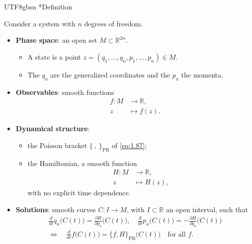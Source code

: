 \documentclass[11pt,a4paper,oneside]{report}
\makeatletter
\newcommand\topic{\@startsection{paragraph}{4}{\z@}{-1.7ex plus -.3ex}{.5ex}{\normalfont\normalsize\bfseries\itshape\boldmath}*}
\makeatother
\begin{document}
\begin{CJK*}{UTF8}{gbsn}
\topic{Definition}

Consider a system with $n$ degrees of freedom.
\begin{itemize}


\item \textbf{\boldmath Phase space}: an open set $M\subset\mathbb R^{2n}$.
\begin{itemize}


\item A state is a point $z=(q_1,\ldots,q_n,p_1,\ldots,p_n)\in M$.

\item The $q_a$ are the generalized coordinates and the $p_a$ the momenta.
\end{itemize}


\item \textbf{\boldmath Observables}: smooth functions
\begin{equation*}
\begin{aligned}
f:M&\to\mathbb R,\\
z&\mapsto f(z).
\end{aligned}
\tag{1.29}\label{eq:1.29}
\end{equation*}

\item \textbf{\boldmath Dynamical structure}:
\begin{itemize}


\item the Poisson bracket $\{\ ,\ \}_{\mathrm{PB}}$ of \eqref{eq:1.87};

\item the Hamiltonian, a smooth function
\begin{equation*}
\begin{aligned}
H:M&\to\mathbb R,\\
z&\mapsto H(z),
\end{aligned}
\tag{1.30}\label{eq:1.30}
\end{equation*}
with no explicit time dependence.
\end{itemize}


\item \textbf{\boldmath Solutions}: smooth curves $C:I\to M$, with $I\subset\mathbb R$ an open interval, such that
\begin{equation*}
\begin{gathered}
\frac{d}{dt}q_a\bigl(C(t)\bigr)=\frac{\partial H}{\partial p_a}\bigl(C(t)\bigr),\quad
\frac{d}{dt}p_a\bigl(C(t)\bigr)=-\frac{\partial H}{\partial q_a}\bigl(C(t)\bigr)
\\[3pt]\Longleftrightarrow\quad
\frac{d}{dt}f\bigl(C(t)\bigr)=\{f,H\}_{\mathrm{PB}}\bigl(C(t)\bigr)\quad\text{for all }f.
\end{gathered}
\tag{1.31}\label{eq:1.31}
\end{equation*}
\end{itemize}



\end{CJK*}
\end{document}

